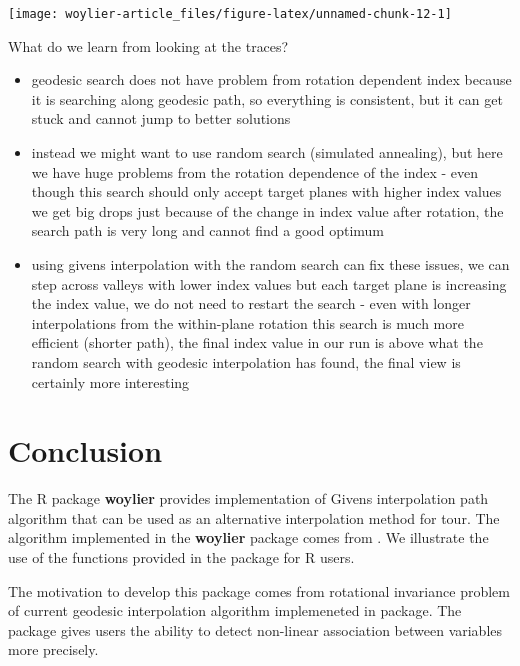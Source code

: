 \begin{Schunk}

\texttt{[image: woylier-article\_files/figure-latex/unnamed-chunk-12-1]} \end{Schunk}

What do we learn from looking at the traces?

\begin{itemize}
\tightlist
\item
  geodesic search does not have problem from rotation dependent index
  because it is searching along geodesic path, so everything is
  consistent, but it can get stuck and cannot jump to better solutions
\item
  instead we might want to use random search (simulated annealing), but
  here we have huge problems from the rotation dependence of the index -
  even though this search should only accept target planes with higher
  index values we get big drops just because of the change in index
  value after rotation, the search path is very long and cannot find a
  good optimum
\item
  using givens interpolation with the random search can fix these
  issues, we can step across valleys with lower index values but each
  target plane is increasing the index value, we do not need to restart
  the search - even with longer interpolations from the within-plane
  rotation this search is much more efficient (shorter path), the final
  index value in our run is above what the random search with geodesic
  interpolation has found, the final view is certainly more interesting
\end{itemize}

\hypertarget{conclusion}{%
\section{Conclusion}\label{conclusion}}

The R package \textbf{woylier} provides implementation of Givens
interpolation path algorithm that can be used as an alternative
interpolation method for tour. The algorithm implemented in the
\textbf{woylier} package comes from
\citet{buja_cook_asimov_hurley_2005}. We illustrate the use of the
functions provided in the package for R users.

The motivation to develop this package comes from rotational invariance
problem of current geodesic interpolation algorithm implemeneted in
 package. The package gives users the ability to detect
non-linear association between variables more precisely.

